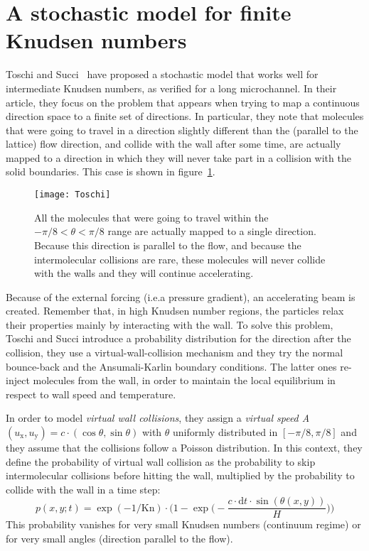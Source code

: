 \section{A stochastic model for finite Knudsen numbers}
Toschi and Succi~\cite{Toschi2005} have proposed a stochastic model that
works well for intermediate Knudsen numbers, as verified for a long microchannel. 
In their article, they focus on the problem
that appears when trying to map a continuous direction space to a finite set of
directions. In particular, they note that molecules that were going to travel in
a direction slightly different than the (parallel to the lattice) flow direction,
and collide with the wall after some time, are actually mapped to a direction
in which they will never take part in a collision with the solid boundaries.
This case is shown in figure~\ref{fig:Toschi}. 

\begin{figure}[h!]%
 	\begin{center}%
 		\texttt{[image: Toschi]}%
 		\caption{All the molecules that were going to travel within the %
 		$-\pi/8 < \theta < \pi/8$ range are actually mapped to %
 		a single direction. Because this direction is parallel to the flow, %
 		and because the intermolecular collisions are rare, these molecules %
 		will never collide with the walls and they will continue accelerating.~\cite{Toschi2005}}%
 		\label{fig:Toschi}%
 	\end{center}%
\end{figure}

Because of the external forcing (i.e.\@ a pressure gradient), an accelerating beam
is created. Remember that, in high Knudsen number regions, the particles relax their
properties mainly by interacting with the wall. 
To solve this problem, Toschi and Succi introduce a probability distribution
for the direction after the collision, they use a virtual-wall-collision mechanism and they
try the normal bounce-back and the Ansumali-Karlin boundary conditions.
The latter ones re-inject molecules from the wall, in order to maintain the
local equilibrium in respect to wall speed and temperature.

In order to model \textit{virtual wall collisions}, they assign a \textit{virtual speed A}
$(u_\mathrm{x}, u_\mathrm{y}) = c \cdot (\cos \theta, \sin \theta)$ with $\theta$
uniformly distributed in $[-\pi/8 , \pi/8]$ and they assume that the collisions
follow a Poisson distribution. In this context, they define the probability
of virtual wall collision as the probability to skip intermolecular collisions before hitting
the wall, multiplied by the probability to collide with the wall in a time step:
\begin{equation}
 p(x, y; t) = \exp( -1/\mathrm{Kn} ) \cdot \Big( 1 - \exp \Big( - \frac{c \cdot \mathrm{d}t \cdot \sin(\theta(x,y))}{H} \Big)   \Big)
\end{equation}
This probability vanishes for very small Knudsen numbers (continuum regime)
or for very small angles (direction parallel to the flow).

